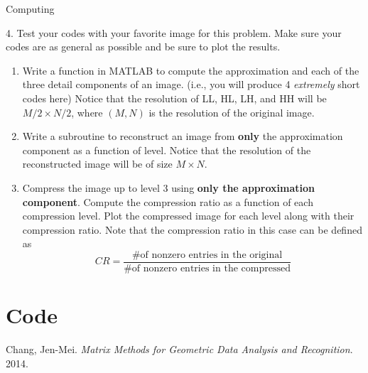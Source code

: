 \begin{section}{Computing}
\begin{homeworkSection}{4. }
Test your codes with your favorite image for this problem. Make sure your codes are as general as possible and be sure to plot the results.
\renewcommand{\theenumi}{\alph{enumi}}
\begin{enumerate}
	\item Write a function in \textsc{MATLAB} to compute the approximation and each of the three detail components of an image. (i.e., you will produce 4 \textit{extremely} short codes here) Notice that the resolution of LL, HL, LH, and HH will be $M/2 \times N/2$, where $(M,N)$ is the resolution of the original image.
	\item Write a subroutine to reconstruct an image from \textbf{only} the approximation component as a function of level. Notice that the resolution of the reconstructed image will be of size $M\times N$.
	\item Compress the image up to level 3 using \textbf{only the approximation component}. Compute the compression ratio as a function of each compression level. Plot the compressed image for each level along with their compression ratio. Note that the compression ratio in this case can be defined as
	$$
		CR = \frac{ \text{\# of nonzero entries in the original} }{ \text{\# of nonzero entries in the compressed} }
	$$
\end{enumerate}
\end{homeworkSection}

\end{section}

\newpage

\appendix

\section{Code}\label{code}

%


\begin{thebibliography}{10}
    Chang, Jen-Mei. \textit{Matrix Methods for Geometric Data Analysis and Recognition}. 2014.

\end{thebibliography}


